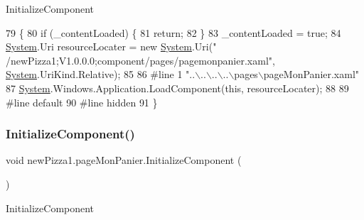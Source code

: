 Initialize\+Component 


\begin{DoxyCode}
79                                           \{
80             \textcolor{keywordflow}{if} (\_contentLoaded) \{
81                 \textcolor{keywordflow}{return};
82             \}
83             \_contentLoaded = \textcolor{keyword}{true};
84             \hyperlink{namespaceSystem}{System}.Uri resourceLocater = \textcolor{keyword}{new} \hyperlink{namespaceSystem}{System}.Uri(\textcolor{stringliteral}{"
      /newPizza1;V1.0.0.0;component/pages/pagemonpanier.xaml"}, \hyperlink{namespaceSystem}{System}.UriKind.Relative);
85             
86 \textcolor{preprocessor}{            #line 1 "..\(\backslash\)..\(\backslash\)..\(\backslash\)..\(\backslash\)pages\(\backslash\)pageMonPanier.xaml"
}
87             \hyperlink{namespaceSystem}{System}.Windows.Application.LoadComponent(\textcolor{keyword}{this}, resourceLocater);
88             
89 \textcolor{preprocessor}{            #line default
}
90 \textcolor{preprocessor}{            #line hidden
}
91         \}
\end{DoxyCode}
\mbox{\label{classnewPizza1_1_1pageMonPanier_af3487726644a638a98b47b824460a5f9}} 
\subsubsection{\texorpdfstring{Initialize\+Component()}{InitializeComponent()}\hspace{0.1cm}{\footnotesize\ttfamily [3/3]}}
{\footnotesize\ttfamily void new\+Pizza1.\+page\+Mon\+Panier.\+Initialize\+Component (\begin{DoxyParamCaption}{ }\end{DoxyParamCaption})\hspace{0.3cm}{\ttfamily [inline]}}



Initialize\+Component 


